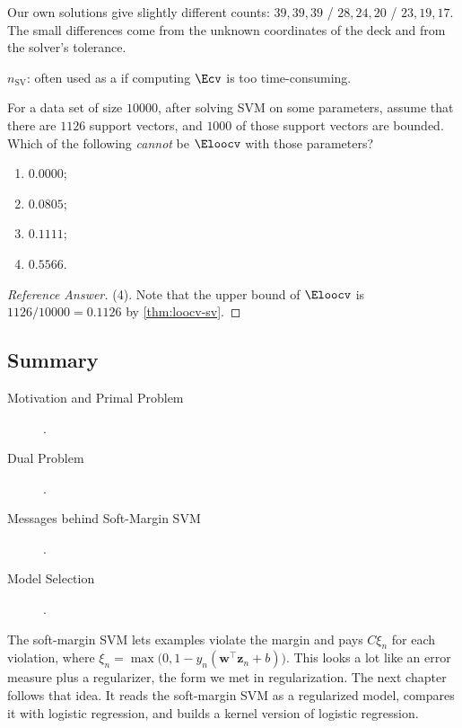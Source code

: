 \begin{note}
    Our own solutions give slightly different counts: \(39, 39, 39\) / \(28,
    24, 20\) / \(23, 19, 17\). The small differences come from the unknown
    coordinates of the deck and from the solver's tolerance.
\end{note}

\begin{moral}
    \(n_{\mathrm{SV}}\): often used as a  if computing
    \(\Ecv\) is too time-consuming.
\end{moral}

\begin{exercise}
    For a data set of size \(10000\), after solving SVM on some parameters,
    assume that there are \(1126\) support vectors, and \(1000\) of those
    support vectors are bounded. Which of the following \emph{cannot} be
    \(\Eloocv\) with those parameters?
    \begin{enumerate}[(1)]
        \item \(0.0000\);
        \item \(0.0805\);
        \item \(0.1111\);
        \item \(0.5566\).
    \end{enumerate}
\end{exercise}

\begin{proof}[Reference Answer]
    (4). Note that the upper bound of \(\Eloocv\) is \(1126 / 10000 =
    0.1126\) by \autoref{thm:loocv-sv}.
\end{proof}

\hrulebar

\subsection*{Summary}

\begin{description}
    \item[Motivation and Primal Problem] .
    \item[Dual Problem] .
    \item[Messages behind Soft-Margin SVM] .
    \item[Model Selection] .
\end{description}

The soft-margin SVM lets examples violate the margin and pays \(C \xi_n\)
for each violation, where \(\xi_n = \max\bigl(0, 1 - y_n (\bm{w}^\top
\bm{z}_n + b)\bigr)\). This looks a lot like an error measure plus a
regularizer, the form we met in regularization. The next chapter follows
that idea. It reads the soft-margin SVM as a regularized model, compares it
with logistic regression, and builds a kernel version of logistic
regression. 

